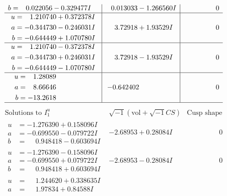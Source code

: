 \documentclass[1p]{elsarticle_modified}
\theoremstyle{definition}
\newcommand{\I}{\sqrt{-1}}
\begin{document}
$$\begin{array}{c|c|c}
\begin{aligned}
b &= \phantom{-}0.022056 - 0.329477 I\end{aligned}
 & \phantom{-}0.013033 - 1.266560 I & \phantom{-0.000000 } 0 \\ \hline\begin{aligned}
u &= \phantom{-}1.210740 + 0.372378 I \\
a &= -0.344730 - 0.246031 I \\
b &= -0.644449 + 1.070780 I\end{aligned}
 & \phantom{-}3.72918 + 1.93529 I & \phantom{-0.000000 } 0 \\ \hline\begin{aligned}
u &= \phantom{-}1.210740 - 0.372378 I \\
a &= -0.344730 + 0.246031 I \\
b &= -0.644449 - 1.070780 I\end{aligned}
 & \phantom{-}3.72918 - 1.93529 I & \phantom{-0.000000 } 0 \\ \hline\begin{aligned}
u &= \phantom{-}1.28089\phantom{ +0.000000I} \\
a &= \phantom{-}8.66646\phantom{ +0.000000I} \\
b &= -13.2618\phantom{ +0.000000I}\end{aligned}
 & -0.642402\phantom{ +0.000000I} & \phantom{-0.000000 } 0\\
 \hline 
 \end{array}$$\newpage$$\begin{array}{c|c|c}  
\text{Solutions to }I^u_{1}& \I (\text{vol} + \sqrt{-1}CS) & \text{Cusp shape}\\
 \hline 
\begin{aligned}
u &= -1.276390 + 0.158096 I \\
a &= -0.699550 - 0.079722 I \\
b &= \phantom{-}0.948418 - 0.603694 I\end{aligned}
 & -2.68953 + 0.28084 I & \phantom{-0.000000 } 0 \\ \hline\begin{aligned}
u &= -1.276390 - 0.158096 I \\
a &= -0.699550 + 0.079722 I \\
b &= \phantom{-}0.948418 + 0.603694 I\end{aligned}
 & -2.68953 - 0.28084 I & \phantom{-0.000000 } 0 \\ \hline\begin{aligned}
u &= \phantom{-}1.244620 + 0.338635 I \\
a &= \phantom{-}1.97834 + 0.84588 I \\

\end{aligned}
\end{array}$$
\end{document}
